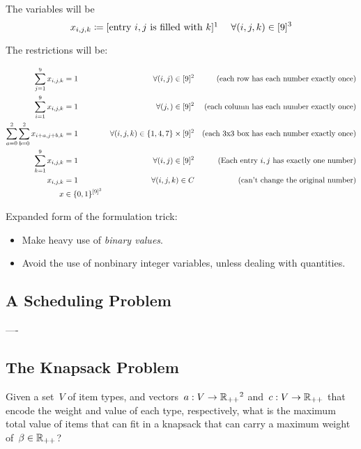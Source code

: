 \documentclass[../main.tex]{subfiles}
\begin{document}
The variables will be
$$x_{i, j, k} \coloneqq [\text{entry } i, j \text{ is filled with } k]\footnotemark \hspace{13pt} \forall (i, j, k) \in [9]^3 $$


The restrictions will be:

\begin{align*}
\sum\limits_{j=1}^9{x_{i,j,k}} &= 1 &\forall (i, j) \in [9]^2 & & \text{(each row has each number exactly once)} \\
\sum\limits_{i=1}^9{x_{i,j,k}} &= 1 &\forall (j, ) \in [9]^2 &  & \text{(each column has each number exactly once)} \\
\sum\limits_{a=0}^2{\sum\limits_{b=0}^2{x_{i+a,j+b,k}}} &= 1 &\forall (i, j, k) \in \{1, 4, 7\} \times [9]^2 & & \text{(each 3x3 box has each number exactly once)} \\
\sum\limits_{k=1}^9{x_{i,j,k}} &= 1 &\forall (i, j) \in [9]^2 & & \text{(Each entry $i, j$ has exactly one number)} \\
x_{i,j,k} &= 1 & \forall (i, j, k) \in C & & \text{(can't change the original number)} \\
x &\in \{0, 1\}^{[9]^3}
\end{align*}

Expanded form of the formulation trick:
\begin{itemize}
\item Make heavy use of \emph{binary values}.
\item Avoid the use of nonbinary integer variables, unless dealing with quantities.
\end{itemize}

\subsection*{A Scheduling Problem}
----

\subsection*{The Knapsack Problem}
Given a set~$V$ of item types, and vectors~${a : V \rightarrow \Rpp\footnotemark}$ and~${c: V \rightarrow \mathbb{R}_{++}}$ that encode the weight and value of each type, respectively, what is the maximum total value of items that can fit in a knapsack that can carry a maximum weight of~${\beta \in \mathbb{R}_{++}}$?

\end{document}
